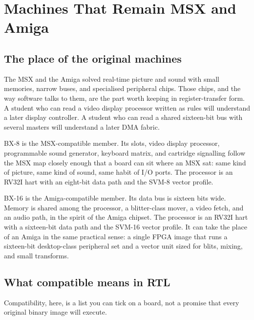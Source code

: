 \chapter{Machines That Remain MSX and Amiga}
\label{ch:machines}

\section{The place of the original machines}

The MSX and the Amiga solved real-time picture and sound with small memories, narrow buses, and specialised peripheral chips. Those chips, and the way software talks to them, are the part worth keeping in register-transfer form. A student who can read a video display processor written as rules will understand a later display controller. A student who can read a shared sixteen-bit bus with several masters will understand a later DMA fabric.

BX-8 is the MSX-compatible member. Its slots, video display processor, programmable sound generator, keyboard matrix, and cartridge signalling follow the MSX map closely enough that a board can sit where an MSX sat: same kind of picture, same kind of sound, same habit of I/O ports. The processor is an RV32I hart with an eight-bit data path and the SVM-8 vector profile.

BX-16 is the Amiga-compatible member. Its data bus is sixteen bits wide. Memory is shared among the processor, a blitter-class mover, a video fetch, and an audio path, in the spirit of the Amiga chipset. The processor is an RV32I hart with a sixteen-bit data path and the SVM-16 vector profile. It can take the place of an Amiga in the same practical sense: a single FPGA image that runs a sixteen-bit desktop-class peripheral set and a vector unit sized for blits, mixing, and small transforms.

\section{What compatible means in RTL}

Compatibility, here, is a list you can tick on a board, not a promise that every original binary image will execute.


